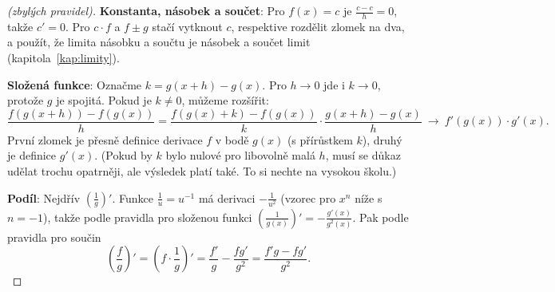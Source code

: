 \begin{proof}[(zbylých pravidel)]
  \textbf{Konstanta, násobek a součet}: Pro $f(x) = c$ je $\frac{c - c}{h} = 0$, takže $c' = 0$. Pro $c\cdot f$ a $f\pm g$ stačí vytknout $c$, respektive rozdělit zlomek na dva, a použít, že limita násobku a součtu je násobek a součet limit (kapitola~\ref{kap:limity}).

  \textbf{Složená funkce}: Označme $k = g(x + h) - g(x)$. Pro $h\to 0$ jde i $k\to 0$, protože $g$ je spojitá. Pokud je $k\neq 0$, můžeme rozšířit:
  \begin{equation*}
    \frac{f(g(x + h)) - f(g(x))}{h} = \frac{f(g(x) + k) - f(g(x))}{k}\cdot\frac{g(x + h) - g(x)}{h}\ \longrightarrow\ f'(g(x))\cdot g'(x).
  \end{equation*}
  První zlomek je přesně definice derivace $f$ v bodě $g(x)$ (s přírůstkem $k$), druhý je definice $g'(x)$. (Pokud by $k$ bylo nulové pro libovolně malá $h$, musí se důkaz udělat trochu opatrněji, ale výsledek platí také. To si nechte na vysokou školu.)

  \textbf{Podíl}: Nejdřív $\left(\frac{1}{g}\right)'$. Funkce $\frac{1}{u} = u^{-1}$ má derivaci $-\frac{1}{u^2}$ (vzorec pro $x^n$ níže s $n = -1$), takže podle pravidla pro složenou funkci $\left(\frac{1}{g(x)}\right)' = -\frac{g'(x)}{g^2(x)}$. Pak podle pravidla pro součin
  \begin{equation*}
    {\left(\frac{f}{g}\right)}' = {\left(f\cdot\frac{1}{g}\right)}' = \frac{f'}{g} - \frac{fg'}{g^2} = \frac{f'g - fg'}{g^2}.
  \end{equation*}
\end{proof}

